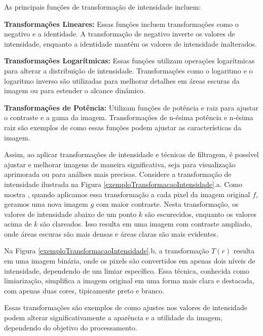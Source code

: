 As principais funções de transformação de intensidade incluem:

\textbf{Transformações Lineares:} Essas funções incluem transformações como o negativo e a identidade. A transformação de negativo inverte os valores de intensidade, enquanto a identidade mantém os valores de intensidade inalterados.

\textbf{Transformações Logarítmicas:} Essas funções utilizam operações logarítmicas para alterar a distribuição de intensidade. Transformações como o logaritmo e o logaritmo inverso são utilizadas para melhorar detalhes em áreas escuras da imagem ou para estender o alcance dinâmico.

\textbf{Transformações de Potência:} Utilizam funções de potência e raiz para ajustar o contraste e a gama da imagem. Transformações de n-ésima potência e n-ésima raiz são exemplos de como essas funções podem ajustar as características da imagem.

Assim, ao aplicar transformações de intensidade e técnicas de filtragem, é possível ajustar e melhorar imagens de maneira significativa, seja para visualização aprimorada ou para análises mais precisas.
Considere a transformação de intensidade ilustrada na Figura \ref{exemploTransformacaoIntensidade}.a. Como mostra , quando aplicamos essa transformação a cada pixel da imagem original $f$, geramos uma nova imagem $g$ com maior contraste. Nesta transformação, os valores de intensidade abaixo de um ponto $k$ são escurecidos, enquanto os valores acima de $k$ são clareados. Isso resulta em uma imagem com contraste ampliado, onde áreas escuras são mais densas e áreas claras são mais evidentes.

Na Figura \ref{exemploTransformacaoIntensidade}.b, a transformação $T(r)$ resulta em uma imagem binária, onde os pixels são convertidos em apenas dois níveis de intensidade, dependendo de um limiar específico. Essa técnica, conhecida como limiarização, simplifica a imagem original em uma forma mais clara e destacada, com apenas duas cores, tipicamente preto e branco.

Essas transformações são exemplos de como ajustes nos valores de intensidade podem alterar significativamente a aparência e a utilidade da imagem, dependendo do objetivo do processamento.

